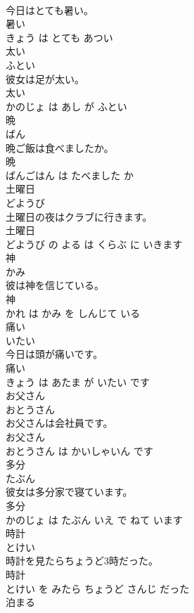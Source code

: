 \documentclass[8pt]{extreport}
\begin{document}
\begin{CJK}{UTF8}{min}
\\	今日はとても暑い。	
\\	暑い 
\\	きょう は とても あつい			
\\	太い	
\\	ふとい			
\\	彼女は足が太い。	
\\	太い 
\\	かのじょ は あし が ふとい			
\\	晩	
\\	ばん			
\\	晩ご飯は食べましたか。	
\\	晩 
\\	ばんごはん は たべました か			
\\	土曜日	
\\	どようび			
\\	土曜日の夜はクラブに行きます。	
\\	土曜日 
\\	どようび の よる は くらぶ に いきます			
\\	神	
\\	かみ			
\\	彼は神を信じている。	
\\	神 
\\	かれ は かみ を しんじて いる			
\\	痛い	
\\	いたい			
\\	今日は頭が痛いです。	
\\	痛い 
\\	きょう は あたま が いたい です			
\\	お父さん	
\\	おとうさん			
\\	お父さんは会社員です。	
\\	お父さん 
\\	おとうさん は かいしゃいん です			
\\	多分	
\\	たぶん			
\\	彼女は多分家で寝ています。	
\\	多分 
\\	かのじょ は たぶん いえ で ねて います			
\\	時計	
\\	とけい			
\\	時計を見たらちょうど3時だった。	
\\	時計 
\\	とけい を みたら ちょうど さんじ だった			
\\	泊まる	

\end{CJK}
\end{document}
